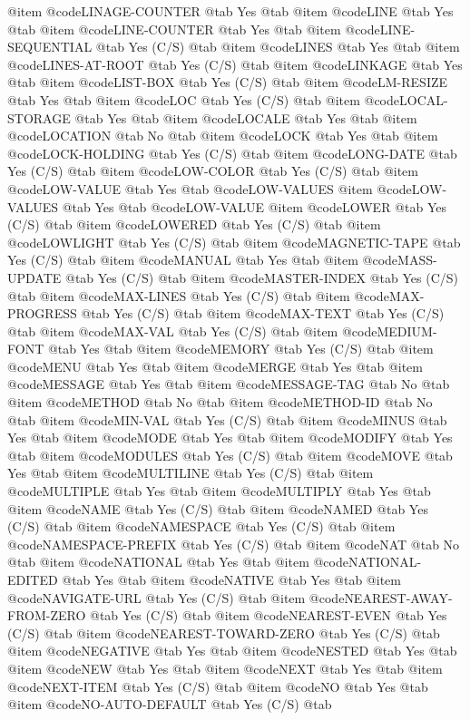 @item @code{LINAGE-COUNTER} @tab Yes @tab
@item @code{LINE} @tab Yes @tab
@item @code{LINE-COUNTER} @tab Yes @tab
@item @code{LINE-SEQUENTIAL} @tab Yes	(C/S) @tab
@item @code{LINES} @tab Yes @tab
@item @code{LINES-AT-ROOT} @tab Yes	(C/S) @tab
@item @code{LINKAGE} @tab Yes @tab
@item @code{LIST-BOX} @tab Yes	(C/S) @tab
@item @code{LM-RESIZE} @tab Yes @tab
@item @code{LOC} @tab Yes	(C/S) @tab
@item @code{LOCAL-STORAGE} @tab Yes @tab
@item @code{LOCALE} @tab Yes @tab
@item @code{LOCATION} @tab No @tab
@item @code{LOCK} @tab Yes @tab
@item @code{LOCK-HOLDING}  @tab Yes (C/S) @tab
@item @code{LONG-DATE} @tab Yes	(C/S) @tab
@item @code{LOW-COLOR} @tab Yes	(C/S) @tab
@item @code{LOW-VALUE} @tab Yes @tab @code{LOW-VALUES}
@item @code{LOW-VALUES} @tab Yes @tab @code{LOW-VALUE}
@item @code{LOWER} @tab Yes	(C/S) @tab
@item @code{LOWERED} @tab Yes	(C/S) @tab
@item @code{LOWLIGHT} @tab Yes	(C/S) @tab
@item @code{MAGNETIC-TAPE} @tab Yes	(C/S) @tab
@item @code{MANUAL} @tab Yes @tab
@item @code{MASS-UPDATE} @tab Yes (C/S) @tab
@item @code{MASTER-INDEX} @tab Yes (C/S) @tab
@item @code{MAX-LINES} @tab Yes	(C/S) @tab
@item @code{MAX-PROGRESS} @tab Yes	(C/S) @tab
@item @code{MAX-TEXT} @tab Yes	(C/S) @tab
@item @code{MAX-VAL} @tab Yes	(C/S) @tab
@item @code{MEDIUM-FONT} @tab Yes @tab
@item @code{MEMORY} @tab Yes	(C/S) @tab
@item @code{MENU} @tab Yes @tab
@item @code{MERGE} @tab Yes @tab
@item @code{MESSAGE} @tab Yes @tab
@item @code{MESSAGE-TAG} @tab No @tab
@item @code{METHOD} @tab No @tab
@item @code{METHOD-ID} @tab No @tab
@item @code{MIN-VAL} @tab Yes	(C/S) @tab
@item @code{MINUS} @tab Yes @tab
@item @code{MODE} @tab Yes @tab
@item @code{MODIFY} @tab Yes @tab
@item @code{MODULES} @tab Yes	(C/S) @tab
@item @code{MOVE} @tab Yes @tab
@item @code{MULTILINE} @tab Yes	(C/S) @tab
@item @code{MULTIPLE} @tab Yes @tab
@item @code{MULTIPLY} @tab Yes @tab
@item @code{NAME} @tab Yes (C/S) @tab
@item @code{NAMED} @tab Yes (C/S) @tab
@item @code{NAMESPACE} @tab Yes	(C/S) @tab
@item @code{NAMESPACE-PREFIX} @tab Yes	(C/S) @tab
@item @code{NAT} @tab No @tab
@item @code{NATIONAL} @tab Yes @tab
@item @code{NATIONAL-EDITED} @tab Yes @tab
@item @code{NATIVE} @tab Yes @tab
@item @code{NAVIGATE-URL} @tab Yes	(C/S) @tab
@item @code{NEAREST-AWAY-FROM-ZERO} @tab Yes	(C/S) @tab
@item @code{NEAREST-EVEN} @tab Yes	(C/S) @tab
@item @code{NEAREST-TOWARD-ZERO} @tab Yes	(C/S) @tab
@item @code{NEGATIVE} @tab Yes @tab
@item @code{NESTED} @tab Yes @tab
@item @code{NEW} @tab Yes @tab
@item @code{NEXT} @tab Yes @tab
@item @code{NEXT-ITEM} @tab Yes	(C/S) @tab
@item @code{NO} @tab Yes @tab
@item @code{NO-AUTO-DEFAULT} @tab Yes	(C/S) @tab
